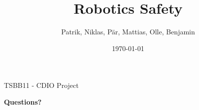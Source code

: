 \documentclass{beamer}
\title[Mister Roboto]{Robotics Safety}
\author{Patrik, Niklas, Pär, Mattias, Olle, Benjamin}
\institute{Computer Vision}
\date{\today}
\begin{document}
\begin{frame}{TSBB11 - CDIO Project}
	\titlepage
\end{frame}











\begin{frame}
	\Huge
	\centering
	\textbf{Questions?}
\end{frame}
 
\end{document}
